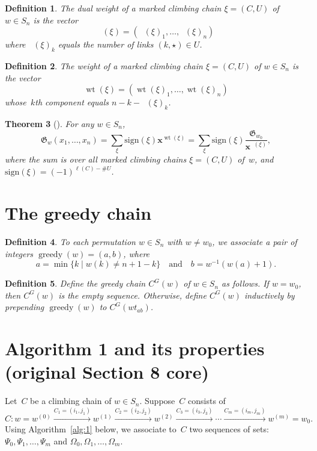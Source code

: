 \documentclass[10pt,a4paper]{amsart}
\DeclareMathOperator{\greedy}{\mathrm{greedy}}
\DeclareMathOperator{\wt}{\mathrm{wt}}
\DeclareMathOperator{\dwt}{\overline{\mathrm{wt}}}
\newcommand{\CG}{C^G}
\newtheorem{theorem}{Theorem}[section]
\newtheorem{definition}[theorem]{Definition}
\begin{document}
\setcounter{section}{4}\setcounter{theorem}{7}
\begin{definition}
	The \emph{dual weight} of a marked climbing chain $\xi=(C,U)$ of $w\in S_n$ is the vector \[\dwt(\xi)=(\dwt(\xi)_1,\ldots,\dwt(\xi)_n) \]
	where $\dwt(\xi)_k$ equals the number of links $(k,\star)\in U$.
\end{definition}

\setcounter{section}{4}\setcounter{theorem}{8}
\begin{definition}
	The \emph{weight} of a marked climbing chain $\xi=(C,U)$ of $w\in S_n$ is the vector \[\wt(\xi)=(\wt(\xi)_1,\ldots,\wt(\xi)_n)\] whose~$k$th component equals $n-k-\dwt(\xi)_k$.
\end{definition}

\setcounter{section}{4}\setcounter{theorem}{9}
\begin{theorem}[{\cite[Theorem 5.6]{LRS}}]
	\label{thm:grothformula}
	For any $w\in S_n$,
	\[\mathfrak{G}_w(x_1,\ldots,x_n) = \sum_{\xi} \mathrm{sign}(\xi) \bm{x}^{\wt(\xi)} =\sum_{\xi} \mathrm{sign}(\xi) \frac{\mathfrak{G}_{w_0}}{\bm{x}^{\dwt(\xi)}}, \]
	where the sum is over all marked climbing chains $\xi=(C,U)$ of~$w$, and $\mathrm{sign}(\xi) = (-1)^{\ell(C)-\#U}$.
\end{theorem}

\section{The greedy chain}
\setcounter{section}{5}\setcounter{theorem}{0}
\begin{definition}
	To each permutation $w\in S_n$ with $w\neq w_0$, we associate a pair of integers $\greedy(w)=(a,b)$, where
	\[a=\min\{k\mid w(k)\neq n+1-k\}\quad \mbox{and}\quad b=w^{-1}(w(a)+1).\] 
\end{definition}

\setcounter{section}{5}\setcounter{theorem}{1}
\begin{definition}
	\label{def:greedy}
	Define the \emph{greedy chain} $\CG(w)$ of $w\in S_n$ as follows. If $w=w_0$, then $\CG(w)$ is the empty sequence. Otherwise, define $\CG(w)$ inductively by prepending $\greedy(w)$ to $\CG(wt_{ab})$.
\end{definition}

\section{Algorithm 1 and its properties (original Section 8 core)}
Let~$C$ be a climbing chain of $w\in S_n$. Suppose~$C$ consists of
\[C: w=w^{(0)} \xrightarrow{C_1=(i_1,j_1)} w^{(1)} \xrightarrow{C_2=(i_2,j_2)} w^{(2)}\xrightarrow{C_3=(i_3,j_3)}\cdots\xrightarrow{C_m=(i_m,j_m)} w^{(m)} = w_0. \]
Using Algorithm~\ref{alg:1} below, we associate to~$C$ two sequences of sets: $\Psi_0,\Psi_1,\ldots,\Psi_m$ and $\Omega_0,\Omega_1,\ldots,\Omega_m$.
\end{document}
